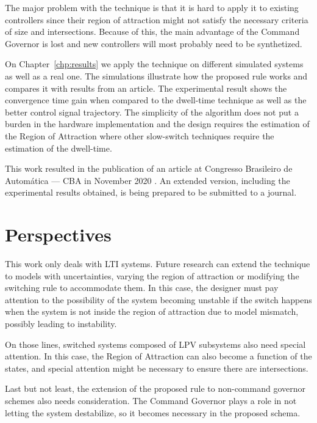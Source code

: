 The major problem with the technique is that it is hard to apply it to existing
controllers since their region of attraction might not satisfy the necessary
criteria of size and intersections. Because of this, the main advantage of the
Command Governor is lost and new controllers will most probably need to be
synthetized.

On Chapter~\ref{chp:results} we apply the technique on different simulated
systems as well as a real one. The simulations illustrate how the proposed rule
works and compares it with results from an article. The experimental result
shows the convergence time gain when compared to the dwell-time technique as
well as the better control signal trajectory. The simplicity of the algorithm
does not put a burden in the hardware implementation and the design requires the
estimation of the Region of Attraction where other slow-switch techniques
require the estimation of the dwell-time.

This work resulted in the publication of an article at Congresso Brasileiro de
Automática --- CBA in November 2020 \parencite{sousa.silva.ea:command}. An
extended version, including the experimental results obtained, is being prepared
to be submitted to a journal.

\section{Perspectives}%
\label{sec:perspectives}

This work only deals with LTI systems. Future research can extend the technique
to models with uncertainties, varying the region of attraction or modifying the
switching rule to accommodate them. In this case, the designer must pay
attention to the possibility of the system becoming unstable if the switch
happens when the system is not inside the region of attraction due to model
mismatch, possibly leading to instability.

On those lines, switched systems composed of LPV subsystems also need special
attention. In this case, the Region of Attraction can also become a function of
the states, and special attention might be necessary to ensure there are
intersections.

Last but not least, the extension of the proposed rule to non-command governor
schemes also needs consideration. The Command Governor plays a role in not
letting the system destabilize, so it becomes necessary in the proposed schema.
